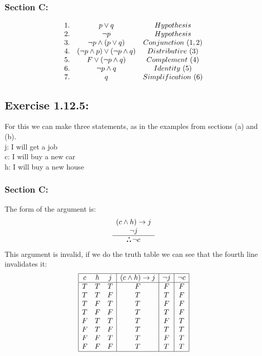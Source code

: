\documentclass[titlepage]{article}\pagestyle{empty}
\def\therefore{\boldsymbol{\text{ }
\leavevmode
\lower0.4ex\hbox{$\cdot$}
\kern-.5em\raise0.7ex\hbox{$\cdot$}
\kern-0.55em\lower0.4ex\hbox{$\cdot$}
\thinspace\text{ }}}
\begin{document}
\subsubsection*{Section C:}
\begin{displaymath}
\begin{array}{c c c}
1. & p \lor q & Hypothesis\\
2. & \neg p & Hypothesis\\
3. & \neg p \land (p \lor q) & Conjunction\ (1,2)\\
4. & (\neg p \land p) \lor (\neg p \land q) &Distributive\ (3)\\
5. & F \lor (\neg p \land q) & Complement\ (4)\\
6. & \neg p \land q & Identity\ (5)\\
7. & q & Simplification\ (6)
\end{array}
\end{displaymath}
\pagebreak
\subsection*{Exercise 1.12.5:}
For this we can make three statements, as in the examples from sections (a) and (b).\\
j: I will get a job\\
c: I will buy a new car\\
h: I will buy a new house
\subsubsection*{Section C:}
The form of the argument is:
\begin{displaymath}
\begin{array}{c}
(c \land h) \to j\\
\neg j\\
\hline
\therefore \neg c
\end{array}
\end{displaymath}
This argument is invalid, if we do the truth table we can see that the fourth line invalidates it:
\begin{displaymath}
\begin{array}{|c c c|c|c|c|}
\hline
c & h & j & (c \land h) \to j & \neg j & \neg c\\
\hline
T & T & T & F & F & F\\
T & T & F & T & T & F\\
T & F & T & T & F & F\\
T & F & F & T & T & F\\
F & T & T & T & F & T\\
F & T & F & T & T & T\\
F & F & T & T & F & T\\
F & F & F & T & T & T\\
\hline
\end{array}
\end{displaymath}
\end{document}

